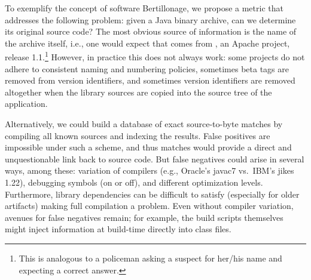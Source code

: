 \label{chapter:newsol}


To exemplify the concept of software Bertillonage, we propose a metric that
addresses the following problem: given a Java binary archive, can we
determine its original source code?
The most obvious source of information is the name of the archive itself,
i.e., one would expect that  comes from
, an Apache project, release 1.1.\footnote{This is
analogous to a policeman asking a suspect for her/his name and expecting a
correct answer.}  However, in practice this does not always work:  some
projects do not adhere to consistent naming and numbering policies,
sometimes beta tags are removed from version identifiers, and sometimes
version identifiers are removed altogether when the library sources are
copied into the source tree of the application.



Alternatively, we could build a database of exact source-to-byte matches by
compiling all known sources and indexing the results.  False positives are
impossible under such a scheme, and thus matches would provide a direct and
unquestionable link back to source code. But false negatives could arise in
several ways, among these: variation of compilers (e.g., Oracle's javac7
vs.\ IBM's jikes 1.22), debugging symbols (on or off), and different
optimization levels.  Furthermore, library dependencies can be difficult to
satisfy (especially for older artifacts) making full compilation a problem.
Even without compiler variation, avenues for false negatives remain; for
example, the build scripts themselves might inject information at
build-time directly into class files.

